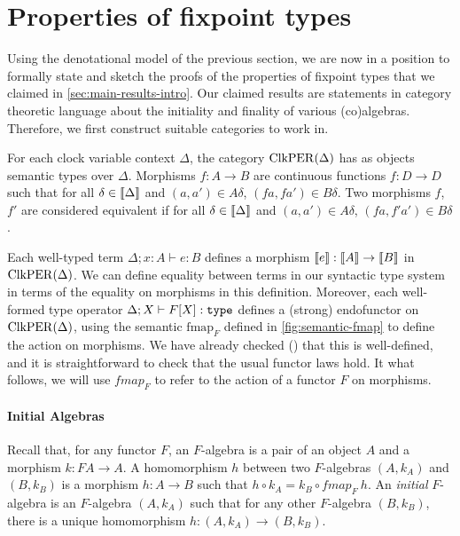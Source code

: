 \section{Properties of fixpoint types}
\label{sec:fixpoint-types}

Using the denotational model of the previous section, we are now in a
position to formally state and sketch the proofs of the properties of
fixpoint types that we claimed in
\autoref{sec:main-results-intro}. Our claimed results are statements
in category theoretic language about the initiality and finality of
various (co)algebras. Therefore, we first construct suitable
categories to work in.

\begin{definition}
  For each clock variable context $\Delta$, the category
  $\mathrm{ClkPER}(\Delta)$ has as objects semantic types over
  $\Delta$. Morphisms $f : A \to B$ are continuous functions $f : D
  \to D$ such that for all $\delta \in \llbracket \Delta \rrbracket$ and $(a,a') \in
  A\delta$, $(fa, fa') \in B\delta$. Two morphisms $f$,$f'$ are
  considered equivalent if for all $\delta \in \llbracket \Delta \rrbracket$ and
  $(a,a') \in A\delta$, $(fa, f'a') \in B\delta$.
\end{definition}

Each well-typed term $\Delta; x : A \vdash e : B$ defines a morphism
$\llbracket e \rrbracket : \llbracket A \rrbracket \to \llbracket B \rrbracket$ in $\mathrm{ClkPER}(\Delta)$. We can define
equality between terms in our syntactic type system in terms of the
equality on morphisms in this definition. Moreover, each well-formed
type operator $\Delta; X \vdash F[X] : \texttt{\textup{type}}$ defines a (strong)
endofunctor on $\mathrm{ClkPER}(\Delta)$, using the semantic $\mathrm{fmap}_F$
defined in \autoref{fig:semantic-fmap} to define the action on
morphisms. We have already checked ()
that this is well-defined, and it is straightforward to check that the
usual functor laws hold. It what follows, we will use
$\mathit{fmap}_F$ to refer to the action of a functor $F$ on
morphisms.

\paragraph{Initial Algebras} Recall that, for any functor $F$, an
$F$-algebra is a pair of an object $A$ and a morphism $k : FA \to
A$. A homomorphism $h$ between two $F$-algebras $(A,k_A)$ and
$(B,k_B)$ is a morphism $h : A \to B$ such that $h \circ k_A = k_B
\circ \mathit{fmap}_F~h$. An \emph{initial} $F$-algebra is an
$F$-algebra $(A,k_A)$ such that for any other $F$-algebra $(B,k_B)$,
there is a unique homomorphism $h : (A,k_A) \to (B,k_B)$.

